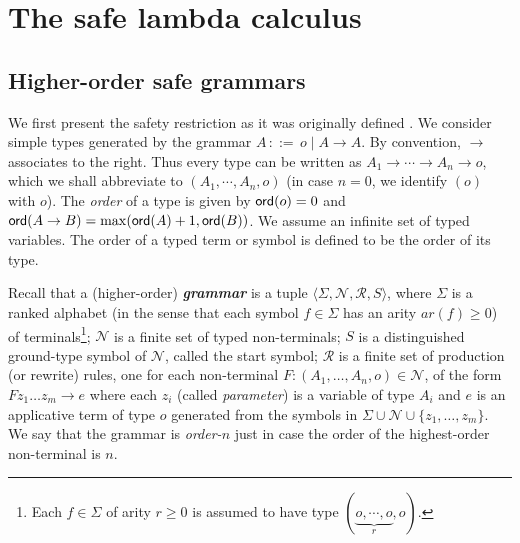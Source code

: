\documentclass{llncs}
\newcommand\defname[1]{{\bf\em #1}\index{#1}}
\newcommand\ord[1]{{\sf
    ord}(#1)} \newcommand\typear{\rightarrow}
\newcommand\union{\cup}
\begin{document}






\section{The safe lambda calculus}
\label{sec:safe}
\subsection*{Higher-order safe grammars}
We first present the safety restriction as it was originally defined
\cite{KNU02}. We consider simple types generated by the grammar $A \,
::= \, o \; | \; A \typear A$. By convention, $\rightarrow$ associates
to the right. Thus every type can be written as $A_1 \typear \cdots
\typear A_n \typear o$, which we shall abbreviate to $(A_1, \cdots,
A_n, o)$ (in case $n = 0$, we identify $(o)$ with $o$). The
\emph{order} of a type is given by $\ord{o} = 0$ and $\ord{A \typear
  B} = \max(\ord{A}+1, \ord{B})$. We assume an infinite set of typed
variables. The order of a typed term or symbol is defined to be the
order of its type.

Recall that a (higher-order) \defname{grammar} is a tuple $\langle
\Sigma, \mathcal{N}, \mathcal{R}, S \rangle$, where $\Sigma$ is a
ranked alphabet (in the sense that each symbol $f \in \Sigma$ has an
arity $\mathit{ar}(f) \geq 0$) of terminals\footnote{Each $f \in
  \Sigma$ of arity $r \geq 0$ is assumed to have type $(\underbrace{o,
    \cdots, o}_r, o)$.}; $\mathcal{N}$ is a finite set of typed
non-terminals; $S$ is a distinguished ground-type symbol of
$\mathcal{N}$, called the start symbol; $\mathcal{R}$ is a finite set
of production (or rewrite) rules, one for each non-terminal $F : (A_1,
\ldots, A_n, o) \in \mathcal{N}$, of the form $ F z_1 \ldots z_m
\rightarrow e$ where each $z_i$ (called \emph{parameter}) is a
variable of type $A_i$ and $e$ is an applicative term of type $o$
generated from the symbols in $\Sigma \union \mathcal{N} \union \{z_1,
\ldots, z_m \}$. We say that the grammar is \emph{order-$n$} just in
case the order of the highest-order non-terminal is $n$.
\end{document}
